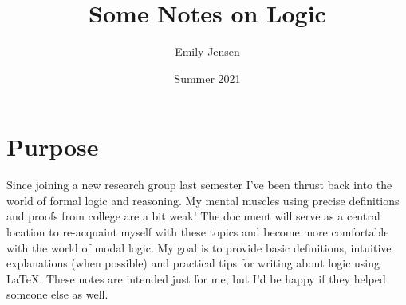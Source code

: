 \documentclass{article}
\title{Some Notes on Logic}
\author{Emily Jensen}
\date{Summer 2021}
\begin{document}
\maketitle

\section{Purpose}
Since joining a new research group last semester I've been thrust back into the world of formal logic and reasoning. My mental muscles using precise definitions and proofs from college are a bit weak! The document will serve as a central location to re-acquaint myself with these topics and become more comfortable with the world of modal logic. My goal is to provide basic definitions, intuitive explanations (when possible) and practical tips for writing about logic using \LaTeX. These notes are intended just for me, but I'd be happy if they helped someone else as well.
\end{document}
